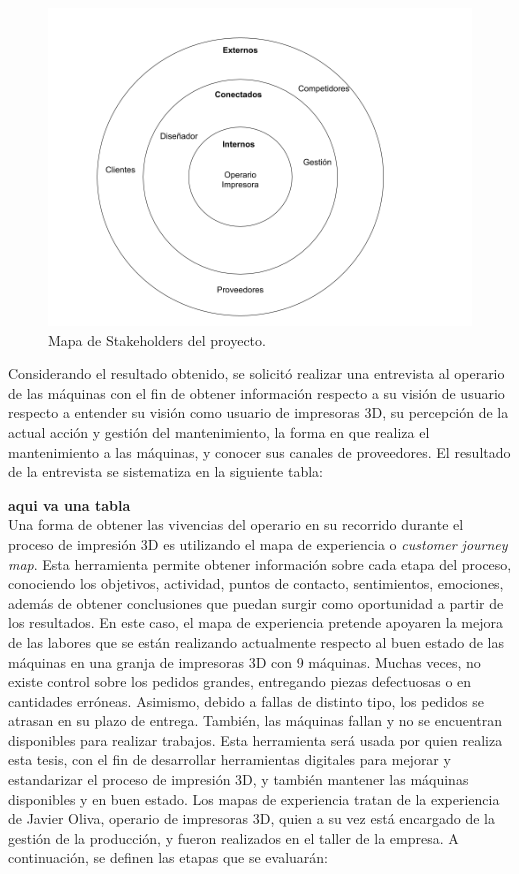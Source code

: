 \begin{figure}[H]
\centering
\includegraphics[scale=0.4]{images/stakeholders.png}
\caption{Mapa de Stakeholders del proyecto.}
\end{figure}

Considerando el resultado obtenido, se solicitó realizar una entrevista al operario de las máquinas con el fin de obtener información respecto a su visión de usuario respecto a entender su visión como usuario de impresoras 3D, su percepción de la actual acción y gestión del mantenimiento, la forma en que realiza el mantenimiento a las máquinas, y conocer sus canales de proveedores. El resultado de la entrevista se sistematiza en la siguiente tabla:

\textbf{aqui va una tabla}\\

Una forma de obtener las vivencias del operario en su recorrido durante el proceso de impresión 3D es utilizando el mapa de experiencia o \textit{customer journey map}. Esta herramienta permite obtener información sobre cada etapa del proceso, conociendo los objetivos, actividad, puntos de contacto, sentimientos, emociones, además de obtener conclusiones que puedan surgir como oportunidad a partir de los resultados. En este caso, el mapa de experiencia pretende apoyaren la mejora de las labores que se están realizando actualmente respecto al buen estado de las máquinas en una granja de impresoras 3D con 9 máquinas. Muchas veces, no existe control sobre los pedidos grandes, entregando piezas defectuosas o en cantidades erróneas. Asimismo, debido a fallas de distinto tipo, los pedidos se atrasan en su plazo de entrega. También, las máquinas fallan y no se encuentran disponibles para realizar trabajos. Esta herramienta será usada por quien realiza esta tesis, con el fin de desarrollar herramientas digitales para mejorar y estandarizar el proceso de impresión 3D, y también mantener las máquinas disponibles y en buen estado. Los mapas de experiencia tratan de la experiencia de Javier Oliva, operario de impresoras 3D, quien a su vez está encargado de la gestión de la producción, y fueron realizados en el taller de la empresa. A continuación, se definen las etapas que se evaluarán:

